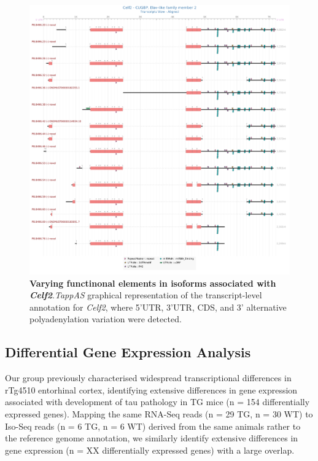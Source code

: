 \begin{figure}[!htp]
	\centering
	\includegraphics[scale = 0.3]{Figures/tappAS_Celf2.png}
	\captionsetup{width=0.95\textwidth}
	\caption[Varying functinonal elements in isoforms associated with \textit{Celf2}]%
	{\textbf{Varying functinonal elements in isoforms associated with \textit{Celf2}}.\textit{TappAS} graphical representation of the transcript-level annotation for \textit{Celf2}, where 5'UTR, 3'UTR, CDS, and 3' alternative polyadenylation variation were detected.}   
	\label{fig:Celf}
\end{figure}	



\clearpage 
\subsection{Differential Gene Expression Analysis}
Our group previously characterised widespread transcriptional differences in rTg4510 entorhinal cortex, identifying extensive differences in gene expression associated with development of tau pathology in TG mice (n = 154 differentially expressed genes)\cite{Castanho2020}. Mapping the same RNA-Seq reads (n = 29 TG, n = 30 WT) to Iso-Seq reads (n = 6 TG, n = 6 WT) derived from the same animals rather to the reference genome annotation, we similarly identify extensive differences in gene expression (n = XX differentially expressed genes) with a large overlap. 

